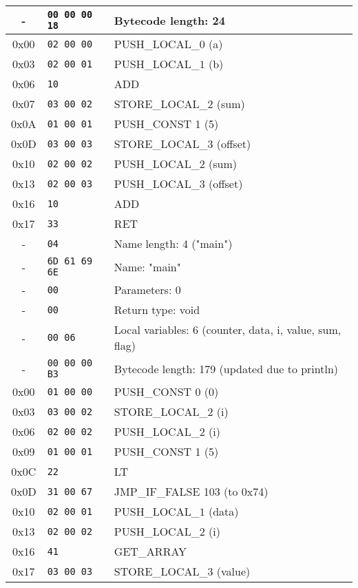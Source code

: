\documentclass[a4paper,12pt]{article}
\begin{document}
\begin{longtable}{|c|l|p{6cm}|}
  - & \texttt{00 00 00 18} & Bytecode length: 24 \\ \hline
  0x00 & \texttt{02 00 00} & PUSH\_LOCAL\_$0$ (a) \\ \hline
  0x03 & \texttt{02 00 01} & PUSH\_LOCAL\_$1$ (b) \\ \hline
  0x06 & \texttt{10} & ADD \\ \hline
  0x07 & \texttt{03 00 02} & STORE\_LOCAL\_$2$ (sum) \\ \hline
  0x0A & \texttt{01 00 01} & PUSH\_CONST 1 (5) \\ \hline
  0x0D & \texttt{03 00 03} & STORE\_LOCAL\_$3$ (offset) \\ \hline
  0x10 & \texttt{02 00 02} & PUSH\_LOCAL\_$2$ (sum) \\ \hline
  0x13 & \texttt{02 00 03} & PUSH\_LOCAL\_$3$ (offset) \\ \hline
  0x16 & \texttt{10} & ADD \\ \hline
  0x17 & \texttt{33} & RET \\ \hline
  - & \texttt{04} & Name length: 4 ("main") \\ \hline
  - & \texttt{6D 61 69 6E} & Name: "main" \\ \hline
  - & \texttt{00} & Parameters: 0 \\ \hline
  - & \texttt{00} & Return type: void \\ \hline
  - & \texttt{00 06} & Local variables: 6 (counter, data, i, value, sum, flag) \\ \hline
  - & \texttt{00 00 00 B3} & Bytecode length: 179 (updated due to println) \\ \hline
  0x00 & \texttt{01 00 00} & PUSH\_CONST 0 (0) \\ \hline
  0x03 & \texttt{03 00 02} & STORE\_LOCAL\_$2$ (i) \\ \hline
  0x06 & \texttt{02 00 02} & PUSH\_LOCAL\_$2$ (i) \\ \hline
  0x09 & \texttt{01 00 01} & PUSH\_CONST 1 (5) \\ \hline
  0x0C & \texttt{22} & LT \\ \hline
  0x0D & \texttt{31 00 67} & JMP\_IF\_FALSE 103 (to 0x74) \\ \hline
  0x10 & \texttt{02 00 01} & PUSH\_LOCAL\_$1$ (data) \\ \hline
  0x13 & \texttt{02 00 02} & PUSH\_LOCAL\_$2$ (i) \\ \hline
  0x16 & \texttt{41} & GET\_ARRAY \\ \hline
  0x17 & \texttt{03 00 03} & STORE\_LOCAL\_$3$ (value) \\ \hline

\end{longtable}
\end{document}
